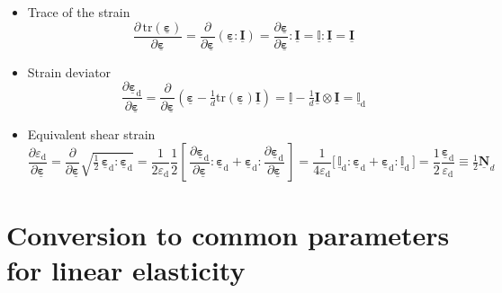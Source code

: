 \documentclass[fleqn, colorlinks]{goose-article}
\newcommand\T[1]{\underline{\bm{{#1}}}}
\newcommand\TT[1]{\underline{\mathbb{{#1}}}}
\begin{document}
\begin{itemize}

    \item Trace of the strain
    \begin{equation}
        \frac{ \partial \, \mathrm{tr} ( \T{\varepsilon} ) }{ \partial \T{\varepsilon} }
        =
        \frac{ \partial }{ \partial \T{\varepsilon} } \left( \T{\varepsilon} : \T{I} \right)
        =
        \frac{ \partial \T{\varepsilon} }{ \partial \T{\varepsilon} } : \T{I}
        =
        \TT{I} : \T{I}
        =
        \T{I}
    \end{equation}

    \item Strain deviator
    \begin{equation}
        \frac{\partial \T{\varepsilon}_\mathrm{d}}{\partial \T{\varepsilon}}
        =
        \frac{\partial}{\partial \T{\varepsilon}}
        \left( \T{\varepsilon} - \tfrac{1}{d} \mathrm{tr} ( \T{\varepsilon} ) \T{I} \right)
        =
        \TT{I} - \tfrac{1}{d} \T{I} \otimes \T{I}
        =
        \TT{I}_\mathrm{d}
    \end{equation}

    \item Equivalent shear strain
    \begin{equation}
        \frac{ \partial \varepsilon_\mathrm{d} }{ \partial \T{\varepsilon} }
        =
        \frac{\partial}{\partial \T{\varepsilon}}
        \sqrt{\tfrac{1}{2}\, \T{\varepsilon}_\mathrm{d} : \T{\varepsilon}_\mathrm{d}}
        =
        \frac{1}{2 \varepsilon_\mathrm{d}}
        \frac{1}{2}
        \left[\, \frac{\partial \T{\varepsilon}_\mathrm{d}}{\partial \T{\varepsilon}}
        : \T{\varepsilon}_\mathrm{d} + \T{\varepsilon}_\mathrm{d}
        : \frac{\partial \T{\varepsilon}_\mathrm{d}}{\partial \T{\varepsilon}} \,\right]
        =
        \frac{1}{4 \varepsilon_\mathrm{d}}
        \big[\, \TT{I}_\mathrm{d} : \T{\varepsilon}_\mathrm{d}
        + \T{\varepsilon}_\mathrm{d} : \TT{I}_\mathrm{d} \,\big]
        =
        \frac{1}{2}
        \frac{\T{\varepsilon}_\mathrm{d}}{\varepsilon_\mathrm{d}}
        \equiv
        \tfrac{1}{2}
        \T{N}_d
    \end{equation}

\end{itemize}

\section{Conversion to common parameters for linear elasticity}
\end{document}
